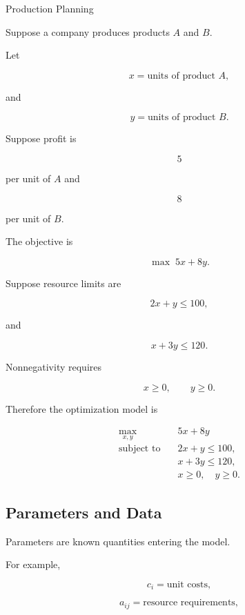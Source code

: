 \begin{workedexamplebox}{Production Planning}

Suppose a company produces products \(A\) and \(B\).

Let

\[
x
=
\text{units of product }A,
\]

and

\[
y
=
\text{units of product }B.
\]

Suppose profit is

\[
5
\]

per unit of \(A\) and

\[
8
\]

per unit of \(B\).

The objective is

\[
\boxed{
\max
\;
5x+8y.
}
\]

Suppose resource limits are

\[
2x+y\leq100,
\]

and

\[
x+3y\leq120.
\]

Nonnegativity requires

\[
x\geq0,
\qquad
y\geq0.
\]

Therefore the optimization model is

\begin{answerbox}
\[
\boxed{
\begin{aligned}
\max_{x,y}
\quad&
5x+8y
\\
\text{subject to}
\quad&
2x+y\leq100,
\\
&
x+3y\leq120,
\\
&
x\geq0,
\quad
y\geq0.
\end{aligned}
}
\]
\end{answerbox}

\end{workedexamplebox}

\subsection{Parameters and Data}
\label{subsec:optimization-parameters-data}

Parameters are known quantities entering the model.

For example,

\[
\boxed{
c_i
=
\text{unit costs},
}
\]

\[
\boxed{
a_{ij}
=
\text{resource requirements},
}
\]

